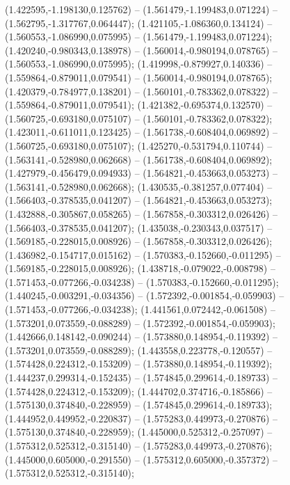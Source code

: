  (1.422595,-1.198130,0.125762) -- (1.561479,-1.199483,0.071224) -- (1.562795,-1.317767,0.064447);
 (1.421105,-1.086360,0.134124) -- (1.560553,-1.086990,0.075995) -- (1.561479,-1.199483,0.071224);
 (1.420240,-0.980343,0.138978) -- (1.560014,-0.980194,0.078765) -- (1.560553,-1.086990,0.075995);
 (1.419998,-0.879927,0.140336) -- (1.559864,-0.879011,0.079541) -- (1.560014,-0.980194,0.078765);
 (1.420379,-0.784977,0.138201) -- (1.560101,-0.783362,0.078322) -- (1.559864,-0.879011,0.079541);
 (1.421382,-0.695374,0.132570) -- (1.560725,-0.693180,0.075107) -- (1.560101,-0.783362,0.078322);
 (1.423011,-0.611011,0.123425) -- (1.561738,-0.608404,0.069892) -- (1.560725,-0.693180,0.075107);
 (1.425270,-0.531794,0.110744) -- (1.563141,-0.528980,0.062668) -- (1.561738,-0.608404,0.069892);
 (1.427979,-0.456479,0.094933) -- (1.564821,-0.453663,0.053273) -- (1.563141,-0.528980,0.062668);
 (1.430535,-0.381257,0.077404) -- (1.566403,-0.378535,0.041207) -- (1.564821,-0.453663,0.053273);
 (1.432888,-0.305867,0.058265) -- (1.567858,-0.303312,0.026426) -- (1.566403,-0.378535,0.041207);
 (1.435038,-0.230343,0.037517) -- (1.569185,-0.228015,0.008926) -- (1.567858,-0.303312,0.026426);
 (1.436982,-0.154717,0.015162) -- (1.570383,-0.152660,-0.011295) -- (1.569185,-0.228015,0.008926);
 (1.438718,-0.079022,-0.008798) -- (1.571453,-0.077266,-0.034238) -- (1.570383,-0.152660,-0.011295);
 (1.440245,-0.003291,-0.034356) -- (1.572392,-0.001854,-0.059903) -- (1.571453,-0.077266,-0.034238);
 (1.441561,0.072442,-0.061508) -- (1.573201,0.073559,-0.088289) -- (1.572392,-0.001854,-0.059903);
 (1.442666,0.148142,-0.090244) -- (1.573880,0.148954,-0.119392) -- (1.573201,0.073559,-0.088289);
 (1.443558,0.223778,-0.120557) -- (1.574428,0.224312,-0.153209) -- (1.573880,0.148954,-0.119392);
 (1.444237,0.299314,-0.152435) -- (1.574845,0.299614,-0.189733) -- (1.574428,0.224312,-0.153209);
 (1.444702,0.374716,-0.185866) -- (1.575130,0.374840,-0.228959) -- (1.574845,0.299614,-0.189733);
 (1.444952,0.449952,-0.220837) -- (1.575283,0.449973,-0.270876) -- (1.575130,0.374840,-0.228959);
 (1.445000,0.525312,-0.257097) -- (1.575312,0.525312,-0.315140) -- (1.575283,0.449973,-0.270876);
 (1.445000,0.605000,-0.291550) -- (1.575312,0.605000,-0.357372) -- (1.575312,0.525312,-0.315140);
